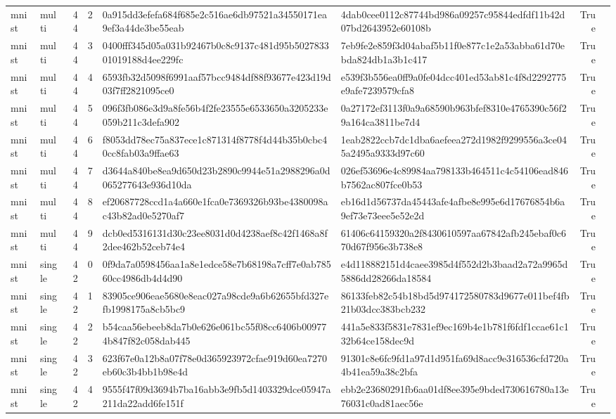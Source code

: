 \begin{tabular}{llrrllrl}
mnist & multi & 44 & 2 & 0a915dd3efefa684f685e2c516ae6db97521a34550171ea9ef3a44de3be55eab & 4dab0cee0112c87744bd986a09257c95844edfdf11b42d07bd2643952e60108b & True &  \\
mnist & multi & 44 & 3 & 0400fff345d05a031b92467b0c8c9137c481d95b502783301019188d4ee229fc & 7eb9fe2e859f3d04abaf5b11f0e877c1e2a53abba61d70ebda824db1a3b1c417 & True &  \\
mnist & multi & 44 & 4 & 6593fb32d5098f6991aaf57bcc9484df88f93677e423d19d03f7ff2821095ce0 & e539f3b556ea0ff9a0fe04dcc401ed53ab81c4f8d2292775e9afe7239579cfa8 & True &  \\
mnist & multi & 44 & 5 & 096f3fb086e3d9a8fe56b4f2fe23555e6533650a3205233e059b211c3defa902 & 0a27172ef3113f0a9a68590b963bfef8310e4765390c56f29a164ca3811be7d4 & True &  \\
mnist & multi & 44 & 6 & f8053dd78ec75a837ece1c871314f8778f4d44b35b0cbc40cc8fab03a9ffae63 & 1eab2822ccb7dc1dba6aefeea272d1982f9299556a3ce045a2495a9333d97c60 & True &  \\
mnist & multi & 44 & 7 & d3644a840be8ea9d650d23b2890c9944e51a2988296a0d065277643e936d10da & 026ef53696e4c89984aa798133b464511c4c54106ead846b7562ac807fce0b53 & True &  \\
mnist & multi & 44 & 8 & ef20687728ccd1a4a660e1fca0e7369326b93be4380098ac43b82ad0e5270af7 & eb16d1d56737da45443afe4afbe8e995e6d17676854b6a9ef73e73eee5e52e2d & True &  \\
mnist & multi & 44 & 9 & dcb0ed5316131d30c23ee8031d0d4238aef8c42f1468a8f2dee462b52ceb74e4 & 61406c64159320a2f8430610597aa67842afb245ebaf0c670d67f956e3b738e8 & True &  \\
mnist & single & 42 & 0 & 0f9da7a0598456aa1a8e1edce58e7b68198a7cff7e0ab78560cc4986db4d4d90 & e4d118882151d4caee3985d4f552d2b3baad2a72a9965d5886dd28266da18584 & True &  \\
mnist & single & 42 & 1 & 83905ce906eae5680e8eac027a98cde9a6b62655bfd327efb1998175a8cb5bc9 & 86133feb82c54b18bd5d974172580783d9677e011bef4fb21b03dcc383bcb232 & True &  \\
mnist & single & 42 & 2 & b54caa56ebeeb8da7b0e626e061bc55f08cc6406b009774b847f82c058dab445 & 441a5e833f5831e7831ef9ec169b4e1b781f6fdf1ccae61c132b64ce158dec9d & True &  \\
mnist & single & 42 & 3 & 623f67e0a12b8a07f78e0d365923972cfae919d60ea7270eb60c3b4bb1b98e4d & 91301c8e6fc9fd1a97d1d951fa69d8acc9e316536cfd720a4b41ea59a38c2bfa & True &  \\
mnist & single & 42 & 4 & 9555f47f09d3694b7ba16abb3e9fb5d1403329dce05947a211da22add6fe151f & ebb2e23680291fb6aa01df8ee395e9bded730616780a13e76031c0ad81aec56e & True &  \\

\end{tabular}
